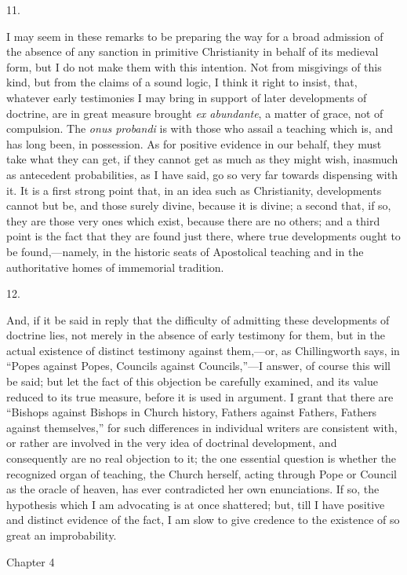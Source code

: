 11.

I may seem in these remarks to be preparing the way for a broad admission of the absence of any sanction in
primitive Christianity in behalf of its medieval form,
but I do not make them with this intention. Not from
misgivings of this kind, but from the claims of a sound
logic, I think it right to insist, that, whatever early
testimonies I may bring in support of later developments
of doctrine, are in great measure brought \emph{ex abundante},
a matter of grace, not of compulsion. The \emph{onus
probandi} is with those who assail a teaching which
is, and has long been, in possession. As for positive
evidence in our behalf, they must take what they can get,
if they cannot get as much as they might wish, inasmuch
as antecedent probabilities, as I have said, go so very
far towards dispensing with it. It is a first strong
point that, in an idea such as Christianity, developments
cannot but be, and those surely divine, because it is
divine; a second that, if so, they are those very ones
which exist, because there are no others; and a third
point is the fact that they are found just there, where
true developments ought to be found,—namely, in the
historic seats of Apostolical teaching and in the
authoritative homes of immemorial tradition.

12.

And, if it be said in reply that the difficulty of
admitting these developments of doctrine lies, not merely
in the absence of early testimony for them, but in the
actual existence of distinct testimony against
them,—or, as Chillingworth says, in ``Popes
against Popes, Councils against Councils,''—I
answer, of course this will be said; but let the fact of
this objection be carefully examined, and its value
reduced to its true measure, before it is used in
argument. I grant that there are ``Bishops against
Bishops in Church history, Fathers against Fathers,
Fathers against themselves,'' for such differences in
individual writers are consistent with, or rather are
involved in the very idea of doctrinal development, and
consequently are no real objection to it; the one
essential question is whether the recognized organ of
teaching, the Church herself, acting through Pope or
Council as the oracle of heaven, has ever contradicted
her own enunciations. If so, the hypothesis which I am
advocating is at once shattered; but, till I have
positive and distinct evidence of the fact, I am slow to
give credence to the existence of so great an
improbability.

Chapter 4

